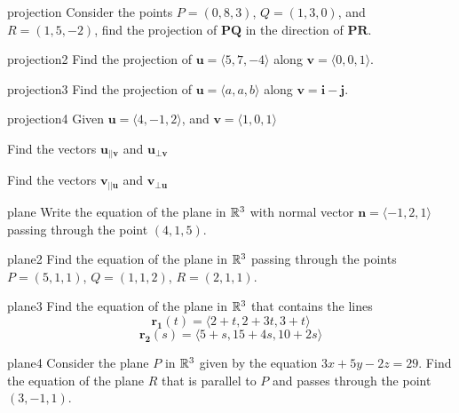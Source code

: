 \begin{problem}{projection}
    Consider the points $P= (0,8,3)$, $Q= (1,3,0)$, and $R= (1,5,-2)$, find the projection of $\bm{PQ}$ in the direction of $\bm{PR}$.
\end{problem}

\begin{problem}{projection2}
    Find the projection of $\bm{u} = \langle 5,7,-4\rangle$ along $\bm{v} = \langle0,0,1\rangle$.
\end{problem}

\begin{problem}{projection3}
    Find the projection of $\bm{u} = \langle a,a,b\rangle$ along $\bm{v} = \bm{i} - \bm{j}$.
\end{problem}

\begin{problem}{projection4}
    Given $\bm{u} = \langle 4, -1, 2 \rangle$, and $\bm{v} = \langle 1, 0, 1 \rangle$
    
    \begin{subproblems}
    \item Find the vectors $\bm{u}_{||\bm{v}}$ and $\bm{u}_{\bot\bm{v}}$
    \item Find the vectors $\bm{v}_{||\bm{u}}$ and $\bm{v}_{\bot\bm{u}}$
    \end{subproblems}
    
\end{problem}


\begin{problem}{plane}
    Write the equation of the plane in $\mathbb{R}^3$ with normal vector $\bm{n} = \langle-1,2,1\rangle$ passing through the point $(4,1,5)$.
\end{problem}

\begin{problem}{plane2}
    Find the equation of the plane in $\mathbb{R}^3$  passing through the points $P = (5,1,1)$, $Q = (1,1,2)$, $R = (2,1,1)$.
\end{problem}

\begin{problem}{plane3}
    Find the equation of the plane in $\mathbb{R}^3$ that contains the lines $$\bm{r_1}(t)= \langle 2 + t, 2 + 3t, 3+ t \rangle$$ $$\bm{r_2}(s)= \langle 5 + s, 15 + 4s, 10 + 2s \rangle$$
\end{problem}

\begin{problem}{plane4}
    Consider the plane $P$ in $\mathbb{R}^3$ given by the equation $3x + 5y-2z = 29$. Find the equation of the plane $R$ that is parallel to $P$ and passes through the point $(3,-1,1)$.
\end{problem}


